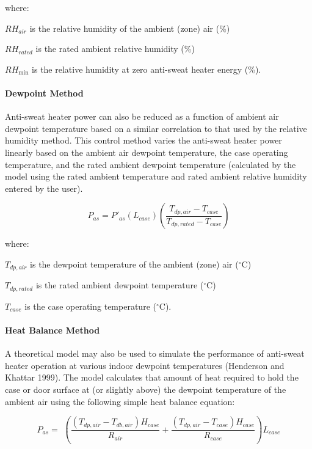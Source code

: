 where:

\(R{H_{air}}\) is the relative humidity of the ambient (zone) air (\%)

\(R{H_{rated}}\) is the rated ambient relative humidity (\%)

\(R{H_{\min }}\) is the relative humidity at zero anti-sweat heater energy (\%).

\paragraph{Dewpoint Method}\label{dewpoint-method}

Anti-sweat heater power can also be reduced as a function of ambient air dewpoint temperature based on a similar correlation to that used by the relative humidity method. This control method varies the anti-sweat heater power linearly based on the ambient air dewpoint temperature, the case operating temperature, and the rated ambient dewpoint temperature (calculated by the model using the rated ambient temperature and rated ambient relative humidity entered by the user).

\begin{equation}
{P_{as}} = {P'}_{as}\left( {{L_{case}}} \right)\left( {\frac{{{T_{dp,air}} - {T_{case}}}}{{{T_{dp,rated}} - {T_{case}}}}} \right)
\end{equation}

where:

\({T_{dp,air}}\) is the dewpoint temperature of the ambient (zone) air (\(^{\circ}\)C)

\({T_{dp,rated}}\) is the rated ambient dewpoint temperature (\(^{\circ}\)C)

\({T_{case}}\) is the case operating temperature (\(^{\circ}\)C).

\paragraph{Heat Balance Method}\label{heat-balance-method}

A theoretical model may also be used to simulate the performance of anti-sweat heater operation at various indoor dewpoint temperatures (Henderson and Khattar 1999). The model calculates that amount of heat required to hold the case or door surface at (or slightly above) the dewpoint temperature of the ambient air using the following simple heat balance equation:

\begin{equation}
{P_{as}} = \,\,\left( {\frac{{\left( {{T_{dp,air}} - {T_{db,air}}} \right){H_{case}}}}{{{R_{air}}}} + \frac{{\left( {{T_{dp,air}} - {T_{case}}} \right){H_{case}}}}{{{R_{case}}}}} \right){L_{case}}
\end{equation}

